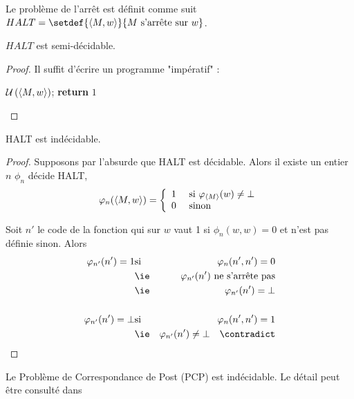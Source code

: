 \begin{definition}
	Le problème de l'arrêt est définit comme suit $HALT = \setdef {\encode{M,w}} {M \text{ s'arrête sur } w}$.
\end{definition}

\begin{prop}
	$HALT$ est semi-décidable.
\end{prop}

\begin{proof}
	Il suffit d'écrire un programme "impératif" :

	\begin{algorithmic}[lines]
		\State $\mathcal U \left(\left\langle M,w\right\rangle\right)$;
		\State \textbf{return} $1$
		\EndFunction
	\end{algorithmic}
\end{proof}

\begin{prop}
	HALT est indécidable.
\end{prop}

\begin{proof}
	Supposons par l'absurde que HALT est décidable. Alors il existe un entier $n$ \tq $\phi_n$ décide HALT, \cad
	$$ \varphi_n(\left\langle M, w\right\rangle ) = \left\{ \begin{array}{ll}
			1 & \text{ si } \varphi_{\left\langle M\right\rangle}(w) \neq \bot \\
			0 & \text{ sinon}
		\end{array}
		\right.$$

	Soit $n'$ le code de la fonction qui sur $w$ vaut 1 si $\phi_n (w,w) = 0 $ et n'est pas définie sinon. Alors
	\begin{eqnarray*}
		\phi_{n'}(n') = 1 & \text{si} & \phi_n(n',n') = 0\\
		&\text{\ie}& \phi_{n'}(n') \text{ ne s'arrête pas} \\
		&\text{\ie}& \phi_{n'}(n') = \bot\\\\
		\phi_{n'}(n') = \bot & \text{si} & \phi_n(n',n') = 1\\
		&\text{\ie}& \phi_{n'}(n') \neq \bot \quad \contradict
	\end{eqnarray*}
\end{proof}

\begin{exemple}
	Le Problème de Correspondance de Post (PCP) est indécidable. Le détail peut être consulté dans \cite[Chapter~5.2]{sipser}
\end{exemple}
